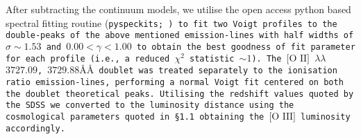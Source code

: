 After subtracting the continuum models, we utilise the open access python based spectral fitting routine (\tt{pyspeckits}; \cite{2011ascl.soft09001G}) to fit two Voigt profiles to the double-peaks of the above mentioned emission-lines with half widths of $\sigma\sim{1.53}$ and ${0.00}<{\gamma}<{1.00}$ to obtain the best goodness of fit parameter for each profile (i.e., a reduced $\chi^{2}$ statistic $\sim{1}$). The $\text{[O II]}$ $\lambda\lambda$$3727.09$, $3729.88ÅÅ$ doublet was treated separately to the ionisation ratio emission-lines, performing a normal Voigt fit centered on both the doublet theoretical peaks. Utilising the redshift values quoted by the SDSS we converted to the luminosity distance using the cosmological parameters quoted in §1.1 obtaining the $\text{[O III]}$ luminosity accordingly.
  
  
  
  
  